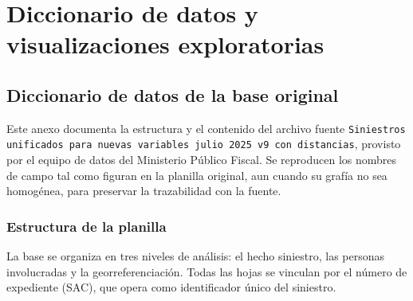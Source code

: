 \chapter{Diccionario de datos y visualizaciones exploratorias}\label{anexos}\label{ap:datos}

\section{Diccionario de datos de la base original}
\label{sec:diccionario-datos}

Este anexo documenta la estructura y el contenido del archivo fuente
\texttt{Siniestros unificados para nuevas variables julio 2025 v9 con distancias},
provisto por el equipo de datos del Ministerio Público Fiscal. Se reproducen los
nombres de campo tal como figuran en la planilla original, aun cuando su grafía no
sea homogénea, para preservar la trazabilidad con la fuente.

\subsection{Estructura de la planilla}
\label{ssec:estructura-planilla}

La base se organiza en tres niveles de análisis: el hecho siniestro, las personas
involucradas y la georreferenciación. Todas las hojas se vinculan por el número de
expediente (SAC), que opera como identificador único del siniestro.

